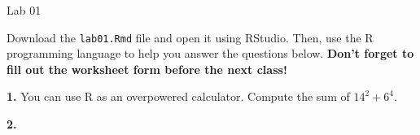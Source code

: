\documentclass{tufte-handout}
\begin{document}
\justify

{\LARGE Lab 01}

\vspace*{18pt}

Download the \texttt{lab01.Rmd} file and open it using RStudio. Then, use the
R programming language to help you answer the questions below. \textbf{Don't
forget to fill out the worksheet form before the next class!}

\vspace*{12pt}

\textbf{1.} You can use R as an overpowered calculator. Compute the sum of
$14^2 + 6^4$.

\textbf{2.}
\end{document}
